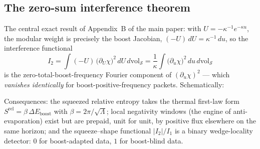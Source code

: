 \documentclass[11pt]{article}
\newcommand{\Srel}{S^{\mathrm{rel}}}
\begin{document}
\subsection{The zero-sum interference theorem}

The central exact result of Appendix~B of the main paper: with $U = -\kappa^{-1}e^{-\kappa u}$, the modular weight is precisely the boost Jacobian, $(-U)\,dU = \kappa^{-1}\,du$, so the interference functional
\[
I_2 = \int (-U)\,\big(\partial_U\chi\big)^2\, dU\, d\mathrm{vol}_{\mathcal{S}}
    = \frac{1}{\kappa}\int \big(\partial_u\chi\big)^2\, du \, d\mathrm{vol}_{\mathcal{S}}
\]
is the zero-total-boost-frequency Fourier component of $(\partial_u\chi)^2$ --- which \emph{vanishes identically} for boost-positive-frequency packets. Schematically:

\begin{center}
\end{center}

\noindent
Consequences: the squeezed relative entropy takes the thermal first-law form $\Srel = \beta\,\Delta E_{\mathrm{boost}}$ with $\beta = 2\pi/\sqrt{\Lambda}$; local negativity windows (the engine of anti-evaporation) exist but are prepaid, unit for unit, by positive flux elsewhere on the same horizon; and the squeeze--shape functional $|I_2|/I_1$ is a binary wedge-locality detector: $0$ for boost-adapted data, $1$ for boost-blind data.
\end{document}
